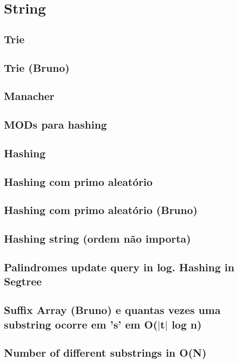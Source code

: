 \section{String}

\subsection{Trie}


\subsection{Trie (Bruno)}


\subsection{Manacher}


\subsection{MODs para hashing}


\subsection{Hashing}


\subsection{Hashing com primo aleatório}


\subsection{Hashing com primo aleatório (Bruno)}


\subsection{Hashing string (ordem não importa)}


\subsection{Palindromes update query in log. Hashing in Segtree}


\subsection{Suffix Array (Bruno) e quantas vezes uma substring ocorre em 's' em O($\vert$t$\vert$ log n)}


\subsection{Number of different substrings in O(N)}
